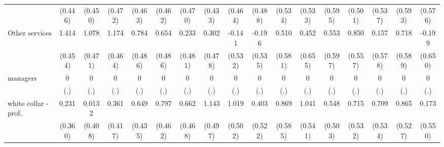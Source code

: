 {\begin{tabular}{l*{16}{c}}
                    &     (0.446)         &     (0.450)         &     (0.472)         &     (0.463)         &     (0.462)         &     (0.470)         &     (0.433)         &     (0.464)         &     (0.488)         &     (0.534)         &     (0.533)         &     (0.595)         &     (0.501)         &     (0.537)         &     (0.593)         &     (0.576)         \\
[1em]
Other services      &       1.414\sym{**} &       1.078\sym{*}  &       1.174\sym{*}  &       0.784         &       0.654         &       0.233         &       0.302         &      -0.141         &      -0.196         &       0.510         &       0.452         &       0.553         &       0.850         &       0.157         &       0.718         &      -0.199         \\
                    &     (0.454)         &     (0.471)         &     (0.464)         &     (0.486)         &     (0.486)         &     (0.481)         &     (0.478)         &     (0.532)         &     (0.535)         &     (0.581)         &     (0.655)         &     (0.597)         &     (0.557)         &     (0.578)         &     (0.589)         &     (0.650)         \\
[1em]
managers            &           0         &           0         &           0         &           0         &           0         &           0         &           0         &           0         &           0         &           0         &           0         &           0         &           0         &           0         &           0         &           0         \\
                    &         (.)         &         (.)         &         (.)         &         (.)         &         (.)         &         (.)         &         (.)         &         (.)         &         (.)         &         (.)         &         (.)         &         (.)         &         (.)         &         (.)         &         (.)         &         (.)         \\
[1em]
white collar - prof.&       0.231         &      0.0132         &       0.361         &       0.649         &       0.797         &       0.662         &       1.143\sym{*}  &       1.019\sym{*}  &       0.403         &       0.869         &       1.041         &       0.548         &       0.715         &       0.709         &       0.865         &       0.173         \\
                    &     (0.360)         &     (0.408)         &     (0.417)         &     (0.435)         &     (0.462)         &     (0.468)         &     (0.497)         &     (0.502)         &     (0.522)         &     (0.585)         &     (0.541)         &     (0.503)         &     (0.532)         &     (0.534)         &     (0.527)         &     (0.550)         \\

\end{tabular}}
